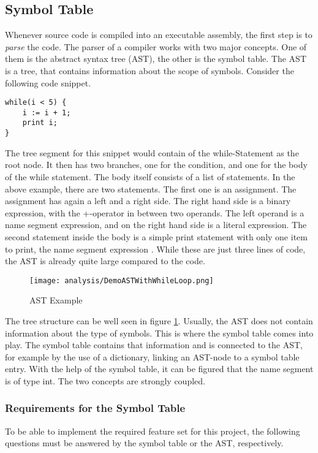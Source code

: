 \subsection{Symbol Table}
Whenever source code is compiled into an executable assembly, the first step is to \textit{parse} the code.
The parser of a compiler works with two major concepts.
One of them is the abstract syntax tree (AST), the other is the symbol table.
The AST is a tree, that contains information about the scope of symbols.
Consider the following code snippet.

\begin{lstlisting}[language=dafny, caption={AST Demo Snippet}, captionpos=b, label={lst:astsnipped}]
while(i < 5) {
    i := i + 1;
    print i;
}
\end{lstlisting}

The tree segment for this snippet would contain of the while-Statement as the root node.
It then has two branches, one for the condition, and one for the body of the while statement.
The body itself consists of a list of statements.
In the above example, there are two statements.
The first one is an assignment.
The assignment has again a left and a right side.
The right hand side is a binary expression, with the +-operator in between two operands.
The left operand is a name segment expression, and on the right hand side is a literal expression.
The second statement inside the body is a simple print statement with only one item to print, the name segment expression .
While these are just three lines of code, the AST is already quite large compared to the code.\\

\begin{figure}[h]
    \centering
    \texttt{[image: analysis/DemoASTWithWhileLoop.png]}
    \caption{AST Example}
    \label{fig:ast_for_example}
\end{figure}

The tree structure can be well seen in figure \ref{fig:ast_for_example}.
Usually, the AST does not contain information about the type of symbols.
This is where the symbol table comes into play.
The symbol table contains that information and is connected to the AST, for example by the use of a dictionary, linking an AST-node to a symbol table entry.
With the help of the symbol table, it can be figured that the name segment  is of type int.
The two concepts are strongly coupled.

\subsubsection{Requirements for the Symbol Table}
To be able to implement the required feature set for this project, the following questions must be answered by the symbol table or the AST, respectively.

